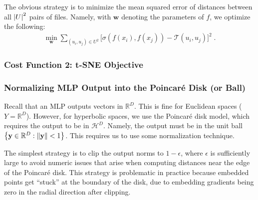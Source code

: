 \documentclass{article}
\begin{document}
The obvious strategy is to minimize the mean squared error of distances between all $\abs{U}^2$ pairs of files. Namely, with $\mathbf w$ denoting the parameters of $f$, we optimize the following:
\begin{align*}
  \min_{\mathbf w} \sum_{(u_i, u_j) \in U^2} \Big[ \sigma(f(x_i), f(x_j)) - \mathcal T(u_i, u_j) \Big]^2 \; .
\end{align*}

\subsubsection{Cost Function 2: t-SNE Objective}


\subsubsection{Normalizing MLP Output into the Poincaré Disk (or Ball)}

Recall that an MLP outputs vectors in $\mathbb R^D$. This is fine for Euclidean spaces ($Y = \mathbb R^D$). However, for hyperbolic spaces, we use the Poincaré disk model, which requires the output to be in $\mathcal H^D$. Namely, the output must be in the unit ball $\qty{\mathbf y \in \mathbb R^D : \norm{\mathbf y} < 1}$. This requires us to use some normalization technique.

The simplest strategy is to clip the output norms to $1-\epsilon$, where $\epsilon$ is sufficiently large to avoid numeric issues that arise when computing distances near the edge of the Poincaré disk. This strategy is problematic in practice because embedded points get ``stuck'' at the boundary of the disk, due to embedding gradients being zero in the radial direction after clipping.
\end{document}
